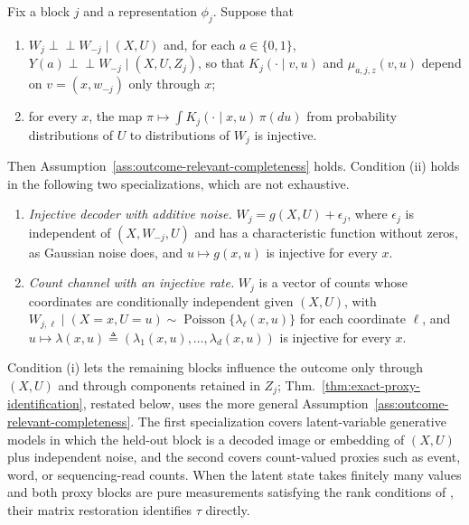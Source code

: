 \begin{proposition}
\label{appdetail:prop:orc-sufficient}
\normalfont

Fix a block $j$ and a representation $\phi_j$. Suppose that
\begin{enumerate}[label=(\roman*),leftmargin=*]
\item $W_j\perp\!\!\!\perp W_{-j}\mid(X,U)$ and, for each $a\in\{0,1\}$, $Y(a)\perp\!\!\!\perp W_{-j}\mid(X,U,Z_j)$, so that $K_j(\cdot\mid v,u)$ and $\mu_{a,j,z}(v,u)$ depend on $v=(x,w_{-j})$ only through $x$;
\item for every $x$, the map $\pi\mapsto\int K_j(\cdot\mid x,u)\,\pi(du)$ from probability distributions of $U$ to distributions of $W_j$ is injective.
\end{enumerate}
Then Assumption~\ref{ass:outcome-relevant-completeness} holds. Condition (ii) holds in the following two specializations, which are not exhaustive.
\begin{enumerate}[label=(\alph*),leftmargin=*]
\item \textit{Injective decoder with additive noise.} $W_j=g(X,U)+\epsilon_j$, where $\epsilon_j$ is independent of $(X,W_{-j},U)$ and has a characteristic function without zeros, as Gaussian noise does, and $u\mapsto g(x,u)$ is injective for every $x$.
\item \textit{Count channel with an injective rate.} $W_j$ is a vector of counts whose coordinates are conditionally independent given $(X,U)$, with $W_{j,\ell}\mid(X=x,U=u)\sim\operatorname{Poisson}\{\lambda_\ell(x,u)\}$ for each coordinate $\ell$, and $u\mapsto\lambda(x,u)\triangleq(\lambda_1(x,u),\ldots,\lambda_{d}(x,u))$ is injective for every $x$.
\end{enumerate}

\end{proposition}

Condition (i) lets the remaining blocks influence the outcome only through $(X,U)$ and through components retained in $Z_j$; Thm.~\ref{thm:exact-proxy-identification}, restated below, uses the more general Assumption~\ref{ass:outcome-relevant-completeness}. The first specialization covers latent-variable generative models in which the held-out block is a decoded image or embedding of $(X,U)$ plus independent noise, and the second covers count-valued proxies such as event, word, or sequencing-read counts. When the latent state takes finitely many values and both proxy blocks are pure measurements satisfying the rank conditions of \citet{kuroki2014measurement}, their matrix restoration identifies $\tau$ directly.

